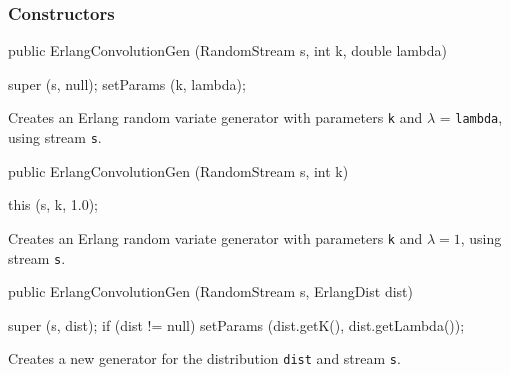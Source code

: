 \subsubsection* {Constructors}
\begin{code}

   public ErlangConvolutionGen (RandomStream s, int k, double lambda) \begin{hide} {
      super (s, null);
      setParams (k, lambda);
   }\end{hide}
\end{code} 
\begin{tabb} Creates an Erlang random variate generator with parameters
 \texttt{k} and $\lambda $ = \texttt{lambda},
  using stream \texttt{s}. 
\end{tabb}
\begin{code}

   public ErlangConvolutionGen (RandomStream s, int k) \begin{hide} {
      this (s, k, 1.0);
   }\end{hide}
\end{code} 
\begin{tabb} Creates an Erlang random variate generator with parameters
 \texttt{k} and $\lambda = 1$, using stream \texttt{s}. 
\end{tabb}
\begin{code}
 
   public ErlangConvolutionGen (RandomStream s, ErlangDist dist) \begin{hide} {
      super (s, dist);
      if (dist != null)
         setParams (dist.getK(), dist.getLambda());
   }\end{hide}
\end{code}
\begin{tabb}  Creates a new generator for the distribution \texttt{dist}
    and stream \texttt{s}.
\end{tabb}

\begin{code} \begin{hide}

   public double nextDouble() {
      return convolution (stream, k, lambda);
   }

   public static double nextDouble (RandomStream s, int k, double lambda) {
      return convolution (s, k, lambda);
   }

   private static double convolution (RandomStream s, int k, double lambda) {
      double x = 0.0;
      for (int i=0;  i<k;  i++)  
         x += ExponentialDist.inverseF (lambda, s.nextDouble());
      return x;
   }
}\end{hide}
\end{code}
